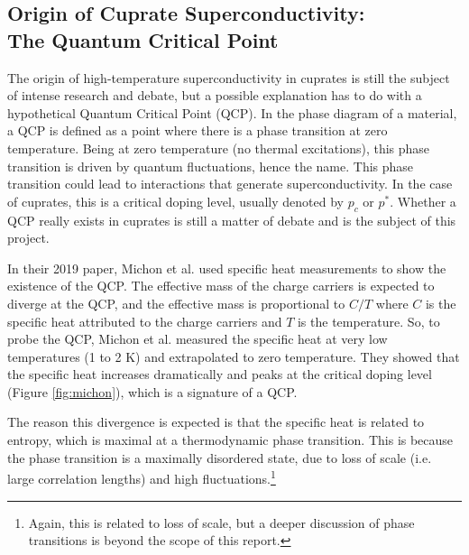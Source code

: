 \subsection{Origin of Cuprate Superconductivity:\\The Quantum Critical Point}
The origin of high-temperature superconductivity in cuprates is still the subject of intense
research and debate, but a possible explanation has to do with a hypothetical Quantum Critical Point (QCP). 
In the phase diagram of a material, a QCP is defined as a point where there is a phase transition at zero temperature. 
Being at zero temperature (no thermal excitations), this phase transition is driven by quantum fluctuations, hence the name. 
This phase transition could lead to interactions that generate superconductivity. 
In the case of cuprates, this is a critical doping level, usually denoted by $p_c$ or $p^*$. 
Whether a QCP really exists in cuprates is still a matter of debate and is the subject of this project.

In their 2019 paper, Michon et al.\cite{michon2019} used specific heat measurements to
show the existence of the QCP. The effective mass of the charge carriers is expected to diverge at
the QCP, and the effective mass is proportional to $C/T$ where $C$ is the specific heat attributed
to the charge carriers and $T$ is the temperature. So, to probe the QCP, Michon et al.\cite{michon2019} measured
the specific heat at very low temperatures (1 to 2 K) and extrapolated to zero temperature. They
showed that the specific heat increases dramatically and peaks at the critical doping level
(Figure \ref{fig:michon}), which is a signature of a QCP.

The reason this divergence is expected is that the specific heat is related
to entropy, which is maximal at a thermodynamic phase transition. 
This is because the phase transition is a maximally disordered state, due to loss of scale (i.e. large correlation lengths) and high
fluctuations.\footnote{Again, this is related to loss of scale, but a deeper discussion of phase
transitions is beyond the scope of this report.}